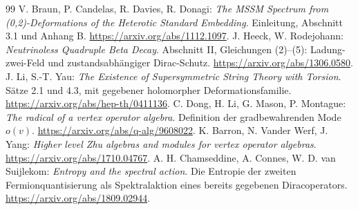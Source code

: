 \begin{thebibliography}{99}
 V. Braun, P. Candelas, R. Davies, R. Donagi: \emph{The MSSM Spectrum from (0,2)-Deformations of the Heterotic Standard Embedding}. Einleitung, Abschnitt 3.1 und Anhang B. \url{https://arxiv.org/abs/1112.1097}.
 J. Heeck, W. Rodejohann: \emph{Neutrinoless Quadruple Beta Decay}. Abschnitt II, Gleichungen (2)--(5): Ladung-zwei-Feld und zustandsabhängiger Dirac-Schutz. \url{https://arxiv.org/abs/1306.0580}.
 J. Li, S.-T. Yau: \emph{The Existence of Supersymmetric String Theory with Torsion}. Sätze 2.1 und 4.3, mit gegebener holomorpher Deformationsfamilie. \url{https://arxiv.org/abs/hep-th/0411136}.
 C. Dong, H. Li, G. Mason, P. Montague:
\emph{The radical of a vertex operator algebra}. Definition der gradbewahrenden Mode $o(v)$.
\url{https://arxiv.org/abs/q-alg/9608022}.
 K. Barron, N. Vander Werf, J. Yang:
\emph{Higher level Zhu algebras and modules for vertex operator algebras}.
\url{https://arxiv.org/abs/1710.04767}.
 A. H. Chamseddine, A. Connes, W. D. van Suijlekom:
\emph{Entropy and the spectral action}. Die Entropie der zweiten
Fermionquantisierung als Spektralaktion eines bereits gegebenen Diracoperators.
\url{https://arxiv.org/abs/1809.02944}.
\end{thebibliography}


